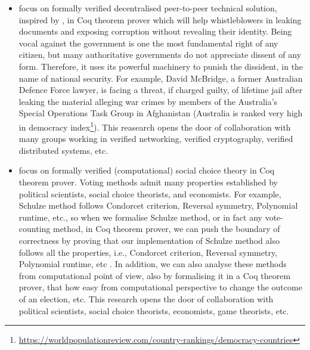 \documentclass[a4paper]{article}
\begin{document}
\begin{itemize}
\item focus on formally verified decentralised peer-to-peer technical solution, inspired by 
\cite{liu2004linkable, noether2015ring}, in Coq theorem prover which will help 
whistleblowers in leaking documents and exposing 
corruption without revealing their identity. 
Being vocal against the government is one the most fundamental right of any citizen, but many 
authoritative governments do not appreciate dissent of any form. Therefore, it uses 
its powerful machinery to punish the dissident, in the name of national security. For example,
David McBridge, a former Australian Defence Force lawyer,  
is facing a threat, if charged guilty, of lifetime jail after
leaking the material alleging war crimes by members of the Australia's Special Operations
Task Group in Afghanistan (Australia is ranked very high in 
democracy index\footnote{\url{https://worldpopulationreview.com/country-rankings/democracy-countries}}). 
This reasearch opens the door of collaboration with many groups working in verified 
networking, verified cryptography, verified distributed systems, etc. 



\item focus on formally verified (computational) social choice theory in Coq theorem prover. 
	Voting methods admit many properties established by political scientists, social choice theorists, 
	and economists. For example, Schulze method follows Condorcet criterion, Reversal symmetry,
	Polynomial runtime, etc., so when we formalise Schulze method, or in fact any vote-counting method,
	in Coq theorem prover, we can push the boundary of correctness by proving that our 
	implementation of Schulze method also follows all the properties, i.e.,  Condorcet criterion, Reversal symmetry,
	Polynomial runtime, etc  \cite{tiwari2021machine}. 
	In addition, we can also analyse these 
	methods from computational point of view, also by formalising it in a Coq theorem prover, 
	that how easy from computational perspective to change the outcome of an election, etc. 
	This research opens the door of collaboration with political scientists, 
	social choice theorists, economists, game theorists, etc. 

	


\end{itemize}
\end{document}
